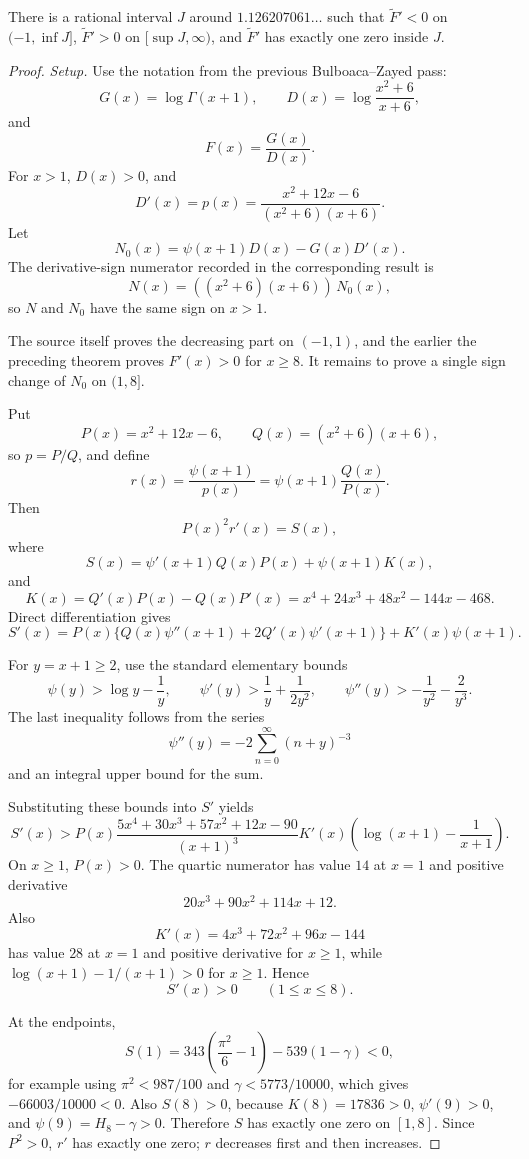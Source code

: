 \begin{proposition}
\label{res:bz-gamma-quotient-critical-window-reduction}
There is a rational interval \(J\) around \(1.126207061\ldots\) such that \(\widetilde F'<0\) on \((-1,\inf J]\), \(\widetilde F'>0\) on \([\sup J,\infty)\), and \(\widetilde F'\) has exactly one zero inside \(J\).
\end{proposition}
\begin{proof}
\emph{Setup.}
Use the notation from the previous Bulboaca--Zayed pass:
\[
G(x)=\log\Gamma(x+1),\qquad
D(x)=\log\frac{x^2+6}{x+6},
\]
and
\[
F(x)=\frac{G(x)}{D(x)}.
\]
For \(x>1\), \(D(x)>0\), and
\[
D'(x)=p(x)=\frac{x^2+12x-6}{(x^2+6)(x+6)}.
\]
Let
\[
N_0(x)=\psi(x+1)D(x)-G(x)D'(x).
\]
The derivative-sign numerator recorded in
the corresponding result is
\[
N(x)=((x^2+6)(x+6))\,N_0(x),
\]
so \(N\) and \(N_0\) have the same sign on \(x>1\).

The source itself proves the decreasing part on \((-1,1)\), and the earlier
the preceding theorem proves \(F'(x)>0\) for
\(x\ge8\).  It remains to prove a single sign change of \(N_0\) on \((1,8]\).

Put
\[
P(x)=x^2+12x-6,\qquad Q(x)=(x^2+6)(x+6),
\]
so \(p=P/Q\), and define
\[
r(x)=\frac{\psi(x+1)}{p(x)}=\psi(x+1)\frac{Q(x)}{P(x)}.
\]
Then
\[
P(x)^2r'(x)=S(x),
\]
where
\[
S(x)=\psi'(x+1)Q(x)P(x)+\psi(x+1)K(x),
\]
and
\[
K(x)=Q'(x)P(x)-Q(x)P'(x)
=x^4+24x^3+48x^2-144x-468.
\]
Direct differentiation gives
\[
S'(x)=P(x)\{Q(x)\psi''(x+1)+2Q'(x)\psi'(x+1)\}+K'(x)\psi(x+1).
\]

For \(y=x+1\ge2\), use the standard elementary bounds
\[
\psi(y)>\log y-\frac1y,\qquad
\psi'(y)>\frac1y+\frac{1}{2y^2},\qquad
\psi''(y)>-\frac1{y^2}-\frac2{y^3}.
\]
The last inequality follows from the series
\[
\psi''(y)=-2\sum_{n=0}^{\infty}(n+y)^{-3}
\]
and an integral upper bound for the sum.

Substituting these bounds into \(S'\) yields
\[
S'(x)>
P(x)\frac{5x^4+30x^3+57x^2+12x-90}{(x+1)^3}
K'(x)\left(\log(x+1)-\frac1{x+1}\right).
\]
On \(x\ge1\), \(P(x)>0\).  The quartic numerator has value \(14\) at \(x=1\)
and positive derivative
\[
20x^3+90x^2+114x+12.
\]
Also
\[
K'(x)=4x^3+72x^2+96x-144
\]
has value \(28\) at \(x=1\) and positive derivative for \(x\ge1\), while
\(\log(x+1)-1/(x+1)>0\) for \(x\ge1\).  Hence
\[
S'(x)>0\qquad(1\le x\le8).
\]

At the endpoints,
\[
S(1)=343\left(\frac{\pi^2}{6}-1\right)-539(1-\gamma)<0,
\]
for example using \(\pi^2<987/100\) and \(\gamma<5773/10000\), which gives
\(-66003/10000<0\).  Also \(S(8)>0\), because \(K(8)=17836>0\),
\(\psi'(9)>0\), and \(\psi(9)=H_8-\gamma>0\).  Therefore \(S\) has exactly
one zero on \([1,8]\).  Since \(P^2>0\), \(r'\) has exactly one zero; \(r\)
decreases first and then increases.


\end{proof}
